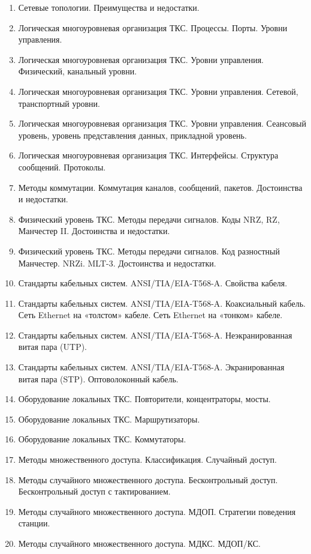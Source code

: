 \documentclass[12pt, russian, oneside, article]{ncc}
\begin{document}
\begin{enumerate}
\item Сетевые топологии. Преимущества и недостатки.
\item Логическая многоуровневая организация ТКС. Процессы. Порты. Уровни управления.
\item Логическая многоуровневая организация ТКС. Уровни управления. Физический, канальный уровни.
\item Логическая многоуровневая организация ТКС. Уровни управления. Сетевой, транспортный уровни.
\item Логическая многоуровневая организация ТКС. Уровни управления. Сеансовый  уровень, уровень представления данных, прикладной уровень.
\item Логическая многоуровневая организация ТКС. Интерфейсы. Структура сообщений. Протоколы.
\item Методы коммутации. Коммутация каналов, сообщений, пакетов. Достоинства и недостатки.
\item Физический уровень ТКС. Методы передачи сигналов. Коды NRZ, RZ, Манчестер II. Достоинства и недостатки.
\item Физический уровень ТКС. Методы передачи сигналов. Код разностный Манчестер. NRZi. MLT-3. Достоинства и недостатки.
\item Стандарты кабельных систем. ANSI/TIA/EIA-T568-A. Свойства кабеля.
\item Стандарты кабельных систем. ANSI/TIA/EIA-T568-A. Коаксиальный кабель. Сеть Ethernet на «толстом» кабеле. Сеть Ethernet на «тонком» кабеле.
\item Стандарты кабельных систем. ANSI/TIA/EIA-T568-A. Неэкранированная витая пара (UTP).
\item Стандарты кабельных систем. ANSI/TIA/EIA-T568-A. Экранированная витая пара (STP). Оптоволоконный кабель.
\item Оборудование локальных ТКС. Повторители, концентраторы, мосты.
\item Оборудование локальных ТКС. Маршрутизаторы.
\item Оборудование локальных ТКС. Коммутаторы.
\item Методы множественного доступа. Классификация. Случайный доступ.
\item Методы случайного множественного доступа. Бесконтрольный доступ. Бесконтрольный доступ с тактированием.
\item Методы случайного множественного доступа. МДОП. Стратегии поведения станции.
\item Методы случайного множественного доступа. МДКС. МДОП/КС.

\end{enumerate}
\end{document}
